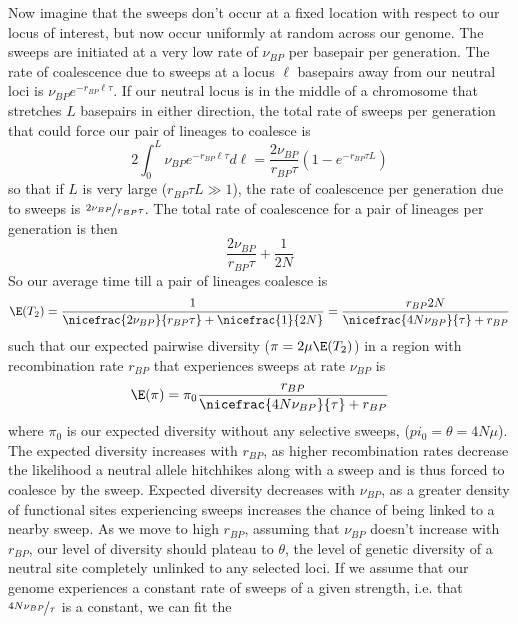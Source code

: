 Now imagine that the sweeps don't occur at a fixed location with
respect to our locus of interest, but now occur uniformly at random
across our genome. The sweeps are initiated at a very low rate of
$\nu_{BP}$ per basepair per generation. The rate of coalescence due to
sweeps at a locus $\ell$ basepairs away from our neutral loci is
$\nu_{BP} e^{-r_{BP} \ell \tau}$. If our neutral locus is in the
middle of a chromosome that stretches $L$ basepairs in either direction,
the total rate of sweeps per generation that could force our pair of lineages to coalesce is
\begin{equation}
2\int_0^{L} \nu_{BP} e^{-r_{BP} \ell \tau} d \ell =
\frac{2\nu_{BP}}{r_{BP} \tau} \left(1-e^{-r_{BP} \tau L} \right)
\end{equation}
so that if $L$ is very large ($r_{BP} \tau L \gg 1$), the rate of coalescence per
generation due to sweeps is $\nicefrac{2\nu_{BP}}{r_{BP} \tau}$. The total rate
of coalescence for a pair of lineages per generation is then
\begin{equation}
\frac{2\nu_{BP}}{r_{BP} \tau}+\frac{1}{2N}
\end{equation}
So our average time till a pair of lineages coalesce is
\begin{equation}
\E(T_2) = \frac{1}{\nicefrac{2\nu_{BP}}{r_{BP} \tau}+\nicefrac{1}{2N}} = \frac{r_{BP}2N}{\nicefrac{4N\nu_{BP}}{ \tau}+r_{BP}}
\end{equation}
such that our expected pairwise diversity ($\pi=2\mu\E(T_2)$) in a region with
recombination rate $r_{BP}$ that experiences sweeps at rate $\nu_{BP}$
is  
\begin{equation}
\E(\pi) = \pi_0 \frac{r_{BP}}{\nicefrac{4N\nu_{BP}}{ \tau}+r_{BP}} \label{eqn:pi_GW_HH}
\end{equation}
where $\pi_0$ is our expected diversity without any selective sweeps, ($pi_0=\theta=4N\mu$).  The expected diversity increases with $r_{BP}$, as higher
recombination rates decrease the likelihood a neutral allele hitchhikes along with a sweep and is thus forced to
coalesce by the sweep. Expected diversity decreases with $\nu_{BP}$, as
a greater density of functional sites experiencing sweeps increases the chance of
being linked to a nearby sweep. As we move to high $r_{BP}$, assuming
that $\nu_{BP}$ doesn't increase with $r_{BP}$, our level of diversity
should plateau to $\theta$, the level of genetic diversity of a
neutral site completely unlinked to any selected loci. If we assume
that our genome experiences a constant rate of sweeps of a given
strength, i.e. that $\nicefrac{4N\nu_{BP}}{ \tau}$ is a constant, we can fit the
